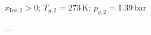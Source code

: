 \( x_{\text{Ice},2} > 0 \); \( T_{g,2} = 273 \, \text{K} \); \( p_{g,2} = 1.39 \, \text{bar} \)  

---